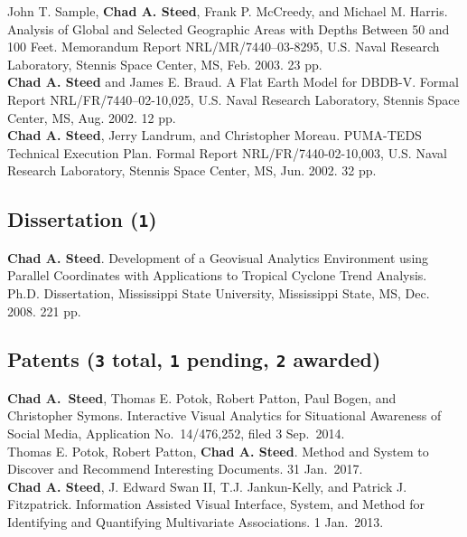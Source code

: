 \documentclass[11pt, letterpaper]{article}
\newcommand{\years}[1]{\marginnote{\scriptsize #1}}
\begin{document}
\begin{sloppypar}
\years{2003}John T. Sample, \textbf{Chad A. Steed}, Frank P. McCreedy, and
Michael M. Harris. Analysis of Global and Selected Geographic Areas with
Depths Between 50 and 100 Feet. Memorandum Report NRL/MR/7440–03-8295, U.S.
Naval Research Laboratory, Stennis Space Center, MS, Feb. 2003. 23 pp.\\
\years{2002}\textbf{Chad A. Steed} and James E. Braud. A Flat Earth Model for
DBDB-V. Formal Report NRL/FR/7440–02-10,025, U.S. Naval Research Laboratory,
Stennis Space Center, MS, Aug. 2002. 12 pp.\\
\years{2002}\textbf{Chad A. Steed}, Jerry Landrum, and Christopher Moreau.
PUMA-TEDS Technical Execution Plan. Formal Report NRL/FR/7440-02-10,003, U.S.
Naval Research Laboratory, Stennis Space Center, MS, Jun. 2002. 32 pp.
\end{sloppypar}

\subsection*{Dissertation (\texttt{1})}
\noindent\years{2008}\textbf{Chad A. Steed}. Development of a Geovisual
Analytics Environment using Parallel Coordinates with Applications to
Tropical Cyclone Trend Analysis. Ph.D. Dissertation, Mississippi State
University, Mississippi State, MS, Dec. 2008. 221 pp.

\subsection*{Patents (\texttt{3} total, \texttt{1} pending, \texttt{2} awarded)}
\noindent\years{2014}\textbf{Chad A.\ Steed}, Thomas E. Potok, Robert Patton,
Paul Bogen, and Christopher Symons. Interactive Visual Analytics for Situational
Awareness of Social Media, Application No.\ 14/476,252, filed 3 Sep.\ 2014.\\
\years{2017} Thomas E. Potok, Robert Patton, \textbf{Chad A. Steed}.
Method and System to Discover and Recommend Interesting Documents. 31 Jan.\ 2017.\\
\years{2013}\textbf{Chad A. Steed}, J. Edward Swan II, T.J. Jankun-Kelly, and
Patrick J. Fitzpatrick. Information Assisted Visual Interface, System, and
Method for Identifying and Quantifying Multivariate Associations. 1 Jan.\ 2013.

\end{document}
